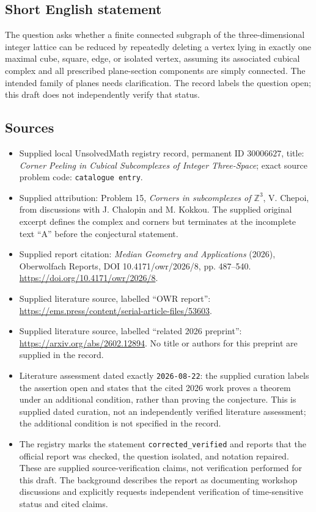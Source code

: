 \documentclass[11pt]{article}
\newcommand{\Z}{\mathbb{Z}}
\begin{document}
\subsection{Short English statement}
The question asks whether a finite connected subgraph of the three-dimensional integer lattice can be reduced by repeatedly deleting a vertex lying in exactly one maximal cube, square, edge, or isolated vertex, assuming its associated cubical complex and all prescribed plane-section components are simply connected. The intended family of planes needs clarification. The record labels the question open; this draft does not independently verify that status.
\subsection{Sources}
\begin{itemize}
\item Supplied local UnsolvedMath registry record, permanent ID \(30006627\), title: \emph{Corner Peeling in Cubical Subcomplexes of Integer Three-Space}; exact source problem code: \texttt{catalogue entry}.
\item Supplied attribution: Problem 15, \emph{Corners in subcomplexes of \(\Z^3\)}, V. Chepoi, from discussions with J. Chalopin and M. Kokkou. The supplied original excerpt defines the complex and corners but terminates at the incomplete text ``A'' before the conjectural statement.
\item Supplied report citation: \emph{Median Geometry and Applications} (2026), Oberwolfach Reports, DOI 10.4171/owr/2026/8, pp. 487--540. \url{https://doi.org/10.4171/owr/2026/8}.
\item Supplied literature source, labelled ``OWR report'': \url{https://ems.press/content/serial-article-files/53603}.
\item Supplied literature source, labelled ``related 2026 preprint'': \url{https://arxiv.org/abs/2602.12894}. No title or authors for this preprint are supplied in the record.
\item Literature assessment dated exactly \texttt{2026-08-22}: the supplied curation labels the assertion open and states that the cited 2026 work proves a theorem under an additional condition, rather than proving the conjecture. This is supplied dated curation, not an independently verified literature assessment; the additional condition is not specified in the record.
\item The registry marks the statement \texttt{corrected\_verified} and reports that the official report was checked, the question isolated, and notation repaired. These are supplied source-verification claims, not verification performed for this draft. The background describes the report as documenting workshop discussions and explicitly requests independent verification of time-sensitive status and cited claims.
\end{itemize}
\end{document}
